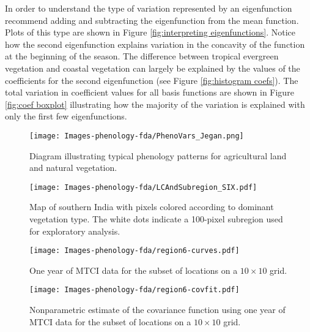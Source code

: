 In order to understand the type of variation represented by an eigenfunction \cite{FDA} recommend adding and subtracting the eigenfunction from the mean function. Plots of this type are shown in Figure \ref{fig:interpreting eigenfunctions}. Notice how the second eigenfunction explains variation in the concavity of the function at the beginning of the season. The difference between tropical evergreen vegetation and coastal vegetation can largely be explained by the values of the coefficients for the second eigenfunction (see Figure \ref{fig:histogram coefs}). The total variation in coefficient values for all basis functions are shown in Figure \ref{fig:coef boxplot} illustrating how the majority of the variation is explained with only the first few eigenfunctions. 
\begin{figure}[htbp] 
	\centering 
	\texttt{[image: Images-phenology-fda/PhenoVars\_Jegan.png]} \caption{Diagram illustrating typical phenology patterns for agricultural land and natural vegetation. } \label{fig:phenology diagram} 
\end{figure}

\begin{figure}
	[htbp] 
	
	\centering 
	\texttt{[image: Images-phenology-fda/LCAndSubregion\_SIX.pdf]} \caption{Map of southern India with pixels colored according to dominant vegetation type. The white dots indicate a 100-pixel subregion used for exploratory analysis.} \label{fig:land use map} 
\end{figure}
\begin{figure}
	[htbp] 
	
	\centering 
	\texttt{[image: Images-phenology-fda/region6-curves.pdf]} \caption{One year of MTCI data for the subset of locations on a $10\times 10$ grid.} \label{fig:region6 curves} 
\end{figure}
\begin{figure}
	\centering 
	\texttt{[image: Images-phenology-fda/region6-covfit.pdf]} \caption{Nonparametric estimate of the covariance function using one year of MTCI data for the subset of locations on a $10\times 10$ grid.} \label{fig:region6 covfit} 
\end{figure}

